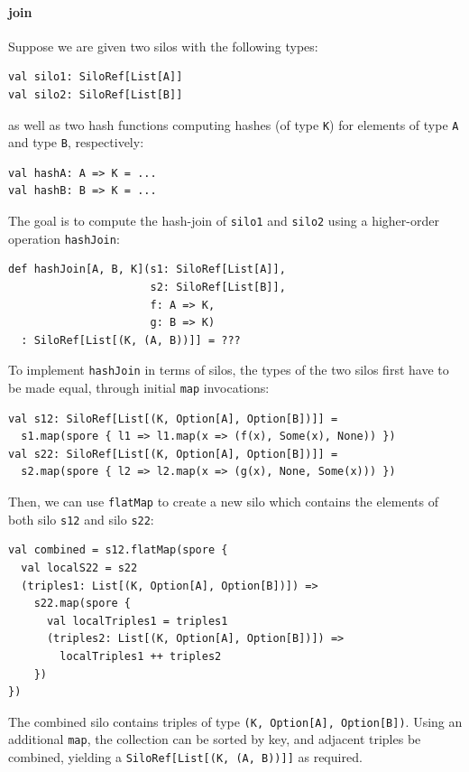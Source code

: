 \documentclass[preprint]{sigplanconf}
\theoremstyle{definition}
\theoremstyle{definition}
\begin{document}
\paragraph{join}

Suppose we are given two silos with the following types:

\begin{lstlisting}
val silo1: SiloRef[List[A]]
val silo2: SiloRef[List[B]]
\end{lstlisting}
\noindent
as well as two hash functions computing hashes (of type \verb|K|) for elements
of type \verb|A| and type \verb|B|, respectively:

\begin{lstlisting}
val hashA: A => K = ...
val hashB: B => K = ...
\end{lstlisting}
\noindent
The goal is to compute the hash-join of \verb|silo1| and \verb|silo2| using a
higher-order operation \verb|hashJoin|:

\begin{lstlisting}
def hashJoin[A, B, K](s1: SiloRef[List[A]],
                      s2: SiloRef[List[B]],
                      f: A => K,
                      g: B => K)
  : SiloRef[List[(K, (A, B))]] = ???
\end{lstlisting}
\noindent
To implement \verb|hashJoin| in terms of silos, the types of the two silos
first have to be made equal, through initial \verb|map| invocations:

\begin{lstlisting}
val s12: SiloRef[List[(K, Option[A], Option[B])]] =
  s1.map(spore { l1 => l1.map(x => (f(x), Some(x), None)) })
val s22: SiloRef[List[(K, Option[A], Option[B])]] =
  s2.map(spore { l2 => l2.map(x => (g(x), None, Some(x))) })
\end{lstlisting}
\noindent
Then, we can use \verb|flatMap| to create a new silo which contains the
elements of both silo \verb|s12| and silo \verb|s22|:

\begin{lstlisting}
val combined = s12.flatMap(spore {
  val localS22 = s22
  (triples1: List[(K, Option[A], Option[B])]) =>
    s22.map(spore {
      val localTriples1 = triples1
      (triples2: List[(K, Option[A], Option[B])]) =>
        localTriples1 ++ triples2
    })
})
\end{lstlisting}
\noindent
The combined silo contains triples of type \verb|(K, Option[A], Option[B])|.
Using an additional \verb|map|, the collection can be sorted by key, and
adjacent triples be combined, yielding a \texttt{SiloRef[List[(K, (A, B))]]} as
required.
\end{document}
